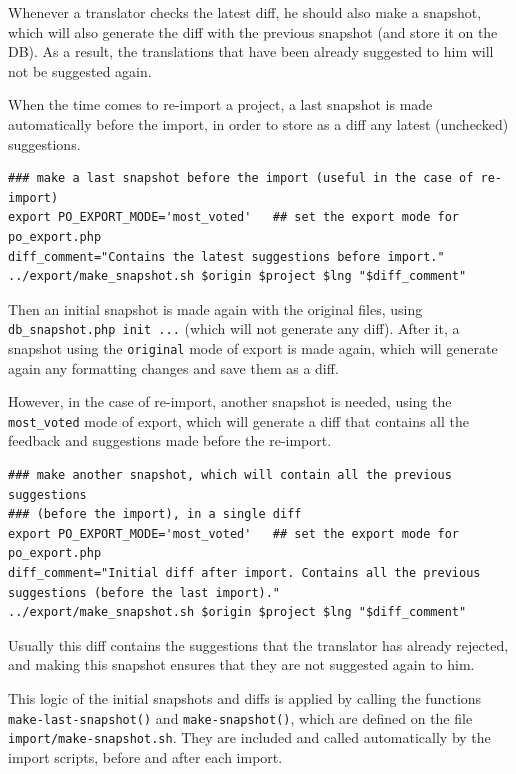 \documentclass[11pt]{article}
\begin{document}
\begin{itemize}
     Whenever a translator checks the latest diff, he should also make a
     snapshot, which will also generate the diff with the previous
     snapshot (and store it on the DB). As a result, the translations
     that have been already suggested to him will not be suggested
     again.

     When the time comes to re-import a project, a last snapshot is made
     automatically before the import, in order to store as a diff any
     latest (unchecked) suggestions.

\begin{verbatim}
### make a last snapshot before the import (useful in the case of re-import)
export PO_EXPORT_MODE='most_voted'   ## set the export mode for po_export.php
diff_comment="Contains the latest suggestions before import."
../export/make_snapshot.sh $origin $project $lng "$diff_comment"
\end{verbatim}


   
     Then an initial snapshot is made again with the original files,
     using \texttt{db\_snapshot.php init ...} (which will not generate any
     diff).  After it, a snapshot using the \texttt{original} mode of export is
     made again, which will generate again any formatting changes and
     save them as a diff.

     However, in the case of re-import, another snapshot is needed,
     using the \texttt{most\_voted} mode of export, which will generate a diff
     that contains all the feedback and suggestions made before the
     re-import.

\begin{verbatim}
### make another snapshot, which will contain all the previous suggestions
### (before the import), in a single diff
export PO_EXPORT_MODE='most_voted'   ## set the export mode for po_export.php
diff_comment="Initial diff after import. Contains all the previous suggestions (before the last import)."
../export/make_snapshot.sh $origin $project $lng "$diff_comment"
\end{verbatim}


     Usually this diff contains the suggestions that the translator has
     already rejected, and making this snapshot ensures that they are
     not suggested again to him.

     This logic of the initial snapshots and diffs is applied by calling
     the functions \texttt{make-last-snapshot()} and \texttt{make-snapshot()}, which
     are defined on the file \texttt{import/make-snapshot.sh}. They are
     included and called automatically by the import scripts, before and
     after each import.



\end{itemize}
\end{document}
